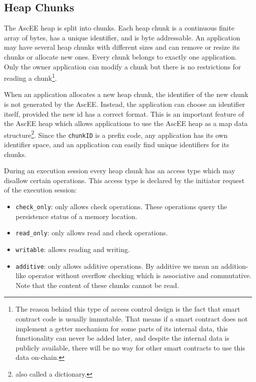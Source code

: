 \subsection{Heap Chunks}\label{subsec:heap}

The AscEE heap is split into chunks. Each heap chunk is a continuous finite array of bytes, has a unique identifier, and
is byte addressable. An application may have several heap chunks with different sizes and can remove or
resize its chunks or allocate new ones. Every chunk belongs to exactly one application. Only the owner application can
modify a chunk but there is no restrictions for reading a chunk\footnote{The reason behind this type of access
control design is the fact that smart contract
code is usually immutable. That means if a smart contract does not implement a
getter mechanism for some parts of its internal data, this functionality can never
be added later, and despite the internal data is publicly available, there will be no
way for other smart contracts to use this data on-chain.}.

When an application allocates a new heap chunk, the identifier of the new chunk is not generated by
the AscEE. Instead, the application can choose an identifier itself, provided the new id has a correct format. This
is an important feature of the AscEE heap which allows applications to use the AscEE heap as a map
data structure\footnote{also called a dictionary.}.
Since the \texttt{chunkID} is a prefix code, any application has its own identifier space, and an application
can easily find unique identifiers for its chunks.

During an execution session every heap chunk has an access type which may disallow certain operations. This access
type is declared by the initiator request of the execution session:

\begin{itemize}
    \item \texttt{check\_only}: only allows check operations. These operations query the persistence
    status of a memory location.
    \item \texttt{read\_only}: only allows read and check operations.
    \item \texttt{writable}: allows reading and writing.
    \item \texttt{additive}: only allows additive operations. By additive we mean an addition-like operator without
    overflow checking which is associative and commutative. Note that the content of these chunks cannot be read.
\end{itemize}

